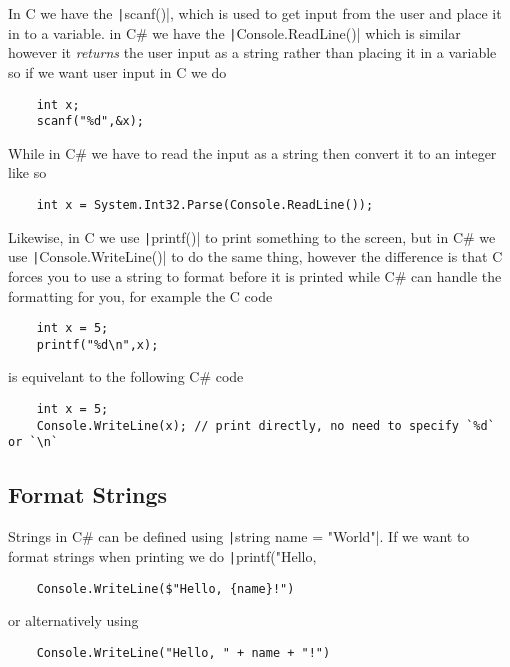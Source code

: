 \documentclass{report}
\begin{document}
In C we have the \texttt|scanf()|, which is used to get input from the user and place it in to a variable. in C\# we have the \texttt|Console.ReadLine()| which is similar however it \emph{returns} the user input as a string rather than placing it in a variable so if we want user input in C we do
\begin{verbatim}
    int x;
    scanf("%d",&x);
\end{verbatim}

While in C\# we have to read the input as a string then convert it to an integer like so

\begin{verbatim}
    int x = System.Int32.Parse(Console.ReadLine());
\end{verbatim}

Likewise, in C we use \texttt|printf()| to print something to the screen, but in C\# we use \texttt|Console.WriteLine()| to do the same thing, however the difference is that C forces you to use a string to format before it is printed while C\# can handle the formatting for you, for example the C code
\begin{verbatim}
    int x = 5;
    printf("%d\n",x);
\end{verbatim}
is equivelant to the following C\# code

\begin{verbatim}
    int x = 5;
    Console.WriteLine(x); // print directly, no need to specify `%d` or `\n`
\end{verbatim}

\subsection{Format Strings}
Strings in C\# can be defined using \texttt|string name = "World"|. If we want to format strings when printing we do \texttt|printf("Hello, %

\begin{verbatim}
    Console.WriteLine($"Hello, {name}!")
\end{verbatim}
or alternatively using
\begin{verbatim}
    Console.WriteLine("Hello, " + name + "!")
\end{verbatim}


\end{document}
